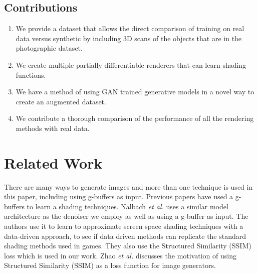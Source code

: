 \documentclass[10pt,twocolumn,letterpaper]{article}
\begin{document}
\subsection{Contributions}
\begin{enumerate}
\item We provide a dataset that allows the direct comparison of training on real data versus synthetic by including 3D scans of the objects that are in the photographic dataset.
\item We create multiple partially differentiable renderers that can learn shading functions.
\item We have a method of using GAN trained generative models in a novel way to create an augmented dataset.
\item We contribute a thorough comparison of the performance of all the rendering methods with real data.
\end{enumerate}
\section{Related Work}

There are many ways to generate images and more than one technique is used in this paper, including using g-buffers as input.  Previous papers have used a g-buffers to learn a shading techniques.  Nalbach \textit{et al.} \cite{DBLP:journals/corr/NalbachAMSR16} uses a similar model architecture as the denoiser we employ as well as using a g-buffer as input.  The authors use it to learn to approximate screen space shading techniques with a data-driven approach, to see if data driven methods can replicate the standard shading methods used in games.  They also use the Structured Similarity (SSIM) loss which is used in our work. 
Zhao \textit{et al.} \cite{DBLP:journals/corr/ZhaoGFK15} discusses the motivation of using Structured Similarity (SSIM) as a loss function for image generators.

\end{document}

